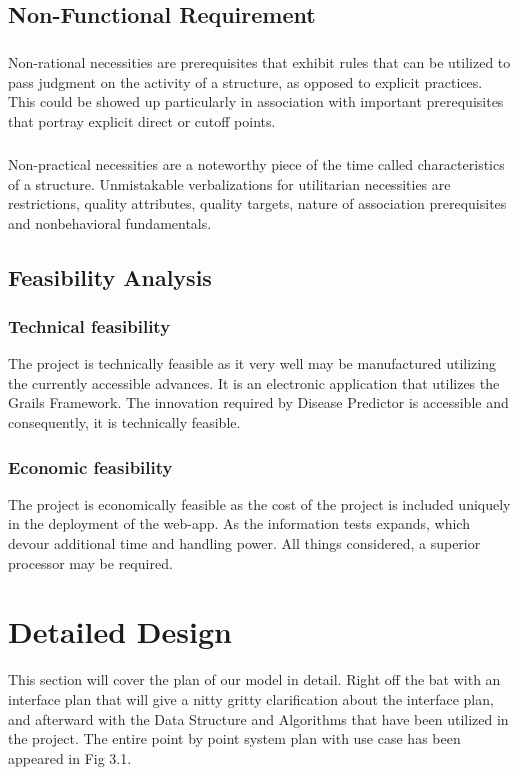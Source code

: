 \documentclass[oneside,12pt]{Classes/VTU}
\begin{document}
    	
    	\section{Non-Functional Requirement}
    	\paragraph{}
    	Non-rational necessities are prerequisites that exhibit rules that can be utilized to pass judgment on the activity of a structure, as opposed to explicit practices. This could be showed up particularly in association with important prerequisites that portray explicit direct or cutoff points. 
    	\paragraph{} 
    	Non-practical necessities are a noteworthy piece of the time called characteristics of a structure. Unmistakable verbalizations for utilitarian necessities are restrictions, quality attributes, quality targets, nature of association prerequisites and nonbehavioral fundamentals.
    	
    	\section{Feasibility Analysis}
    	\subsection{Technical feasibility} 
    	The project is technically feasible as it very well may be manufactured utilizing the currently accessible advances. It is an electronic application that utilizes the Grails Framework. The innovation required by Disease Predictor is accessible and consequently, it is technically feasible.
    	
    	\subsection{Economic feasibility} 
    	The project is economically feasible as the cost of the project is included uniquely in the deployment of the web-app. As the information tests expands, which devour additional time and handling power. All things considered, a superior processor may be required.
    	
	
	\chapter{Detailed Design}
    	This section will cover the plan of our model in detail. Right off the bat with an interface plan that will give a nitty gritty clarification about the interface plan, and afterward with the Data Structure and Algorithms that have been utilized in the project. The entire point by point system plan with use case has been appeared in Fig 3.1.
    	
\end{document}
